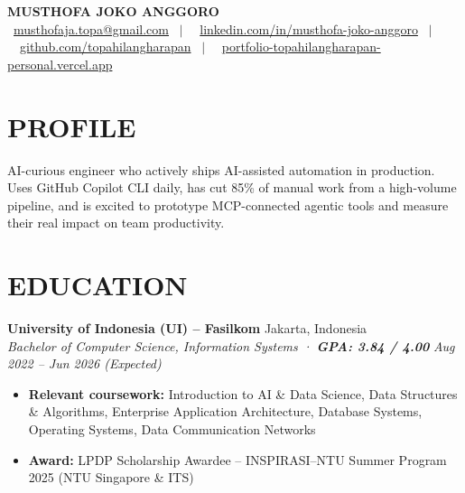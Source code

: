 \documentclass[10pt,a4paper]{article}
\newcommand{\contactline}[1]{\small #1}
\newcommand{\experienceheader}[4]{
    \textbf{#1} \hfill #2 \\
    \textit{#3} \hfill \textit{#4}
}
\begin{document}
\begin{center}
    {\LARGE \textbf{MUSTHOFA JOKO ANGGORO}} \\[2pt]
    \contactline{
        \faEnvelope\ \href{mailto:musthofaja.topa@gmail.com}{musthofaja.topa@gmail.com} \ $|$ \ 
        \faLinkedin\ \href{https://www.linkedin.com/in/musthofa-joko-anggoro/}{linkedin.com/in/musthofa-joko-anggoro} \ $|$ \
        \faGithub\ \href{https://github.com/topahilangharapan}{github.com/topahilangharapan} \ $|$ \
        \faGlobe\ \href{https://portfolio-topahilangharapan-personal.vercel.app/}{portfolio-topahilangharapan-personal.vercel.app}
    }
\end{center}

\vspace{-6pt}

\section*{PROFILE}

AI-curious engineer who actively ships AI-assisted automation in production. Uses GitHub Copilot CLI daily, has cut 85\% of manual work from a high-volume pipeline, and is excited to prototype MCP-connected agentic tools and measure their real impact on team productivity.

\vspace{-4pt}

\section*{EDUCATION}

\experienceheader{University of Indonesia (UI) -- Fasilkom}{Jakarta, Indonesia}{Bachelor of Computer Science, Information Systems · \textbf{GPA: 3.84 / 4.00}}{Aug 2022 -- Jun 2026 (Expected)}
\begin{itemize}[leftmargin=*, itemsep=1pt, topsep=1pt]
    \item \textbf{Relevant coursework:} Introduction to AI \& Data Science, Data Structures \& Algorithms, Enterprise Application Architecture, Database Systems, Operating Systems, Data Communication Networks
    \item \textbf{Award:} LPDP Scholarship Awardee -- INSPIRASI--NTU Summer Program 2025 (NTU Singapore \& ITS)
\end{itemize}
\end{document}
